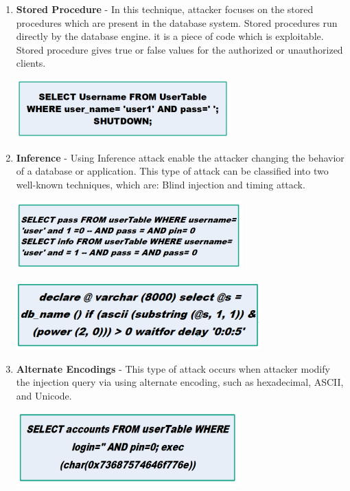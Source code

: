 \documentclass{article}
\begin{document}
\begin{enumerate}
\begin{center}
\end{center}
\item \textbf{Stored Procedure} - In this technique, attacker focuses on the stored procedures which are present in the database
system. Stored procedures run directly by the database engine. it is a piece of code which is exploitable. Stored
procedure gives true or false values for the authorized or unauthorized clients.
\begin{center}
\includegraphics[scale=1]{6}
\end{center}
\item \textbf{Inference} - Using Inference attack enable the attacker changing the behavior of a database or application. This
type of attack can be classified into two well-known techniques, which are: Blind injection and timing attack.
\begin{center}
\includegraphics[scale=1]{7}
\end{center}
\begin{center}
\includegraphics[scale=1]{8}
\end{center}
\item \textbf{Alternate Encodings} - This type of attack occurs when attacker modify the injection query via using alternate
encoding, such as hexadecimal, ASCII, and Unicode.
\begin{center}
\includegraphics[scale=1]{9}
\end{center}
\end{enumerate}
\end{document}
